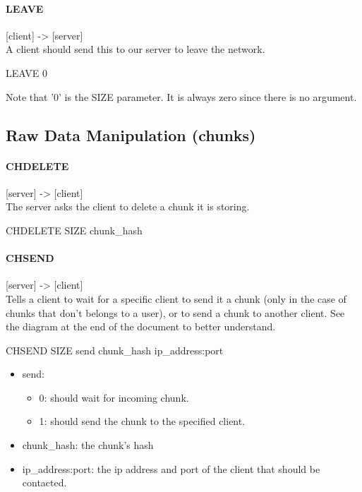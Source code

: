 \documentclass{article}
\begin{document}
\paragraph{LEAVE}

[client] -> [server]\\
A client should send this to our server to leave the network.\\

\begin{center}LEAVE 0\end{center}

Note that '0' is the SIZE parameter. It is always zero since there is no argument.\\

\subsection{Raw Data Manipulation (chunks)}

\paragraph{CHDELETE}

[server] -> [client]\\
The server asks the client to delete a chunk it is storing.

\begin{center}CHDELETE SIZE chunk\_hash\end{center}

\paragraph{CHSEND}

[server] -> [client]\\
 Tells a client to wait for a specific client to send it a chunk (only in the case of chunks that don't belongs to a user), or to send a chunk to another client. See the diagram at the end of the document to better understand.

\begin{center}CHSEND SIZE send chunk\_hash ip\_address:port\end{center}

\begin{itemize}
  \item send: \begin{itemize}
    \item 0: should wait for incoming chunk.
    \item 1: should send the chunk to the specified client.
    \end{itemize}
  \item chunk\_hash: the chunk's hash
  \item ip\_address:port: the ip address and port of the client that should be contacted.
\end{itemize}
    
\end{document}
